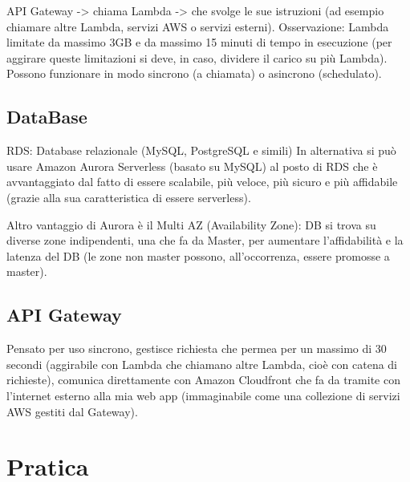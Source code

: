 \documentclass{classes/base}
\begin{document}
    API Gateway -> chiama Lambda -> che svolge le sue istruzioni (ad esempio chiamare altre Lambda, servizi AWS o servizi esterni).
    Osservazione: Lambda limitate da massimo 3GB e da massimo 15 minuti di tempo in esecuzione (per aggirare queste limitazioni si deve, in caso, dividere il carico su più Lambda).
    Possono funzionare in modo sincrono (a chiamata) o asincrono (schedulato).

    \subsection*{DataBase}
    RDS: Database relazionale (MySQL, PostgreSQL e simili)
    In alternativa si può usare Amazon Aurora Serverless (basato su MySQL) al posto di RDS che è avvantaggiato dal fatto di essere scalabile, più veloce, più sicuro e più affidabile (grazie alla sua caratteristica di essere serverless).

    Altro vantaggio di Aurora è il Multi AZ (Availability Zone): DB si trova su diverse zone indipendenti, una che fa da Master, per aumentare l'affidabilità e la latenza del DB (le zone non master possono, all'occorrenza, essere promosse a master).

    \subsection*{API Gateway} 
    Pensato per uso sincrono, gestisce richiesta che permea per un massimo di 30 secondi (aggirabile con Lambda che chiamano altre Lambda, cioè con catena di richieste),
    comunica direttamente con Amazon Cloudfront che fa da tramite con l'internet esterno alla mia web app (immaginabile come una collezione di servizi AWS gestiti dal Gateway).

    \section*{Pratica}
\end{document}
